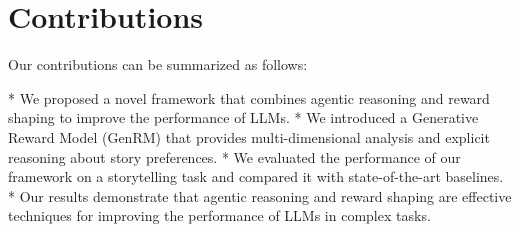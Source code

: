 \documentclass{article}
\begin{document}
\section{Contributions}
Our contributions can be summarized as follows:

* We proposed a novel framework that combines agentic reasoning and reward shaping to improve the performance of LLMs.
* We introduced a Generative Reward Model (GenRM) that provides multi-dimensional analysis and explicit reasoning about story preferences.
* We evaluated the performance of our framework on a storytelling task and compared it with state-of-the-art baselines.
* Our results demonstrate that agentic reasoning and reward shaping are effective techniques for improving the performance of LLMs in complex tasks.
\end{document}
